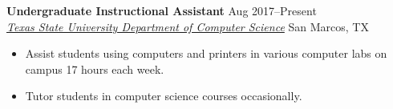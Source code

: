 \documentclass[10pt]{article}
\newcommand{\ressubheading}[4]{
    \textbf{#1} \hfill #2 \\[0pt]
    \textit{#3} \hfill #4 \\[0pt]
}
\newenvironment{resitemize}{
    \vspace{-6pt}
    \begin{itemize}
    \setlength\itemsep{-2pt}
}{
    \end{itemize}
}
\begin{document}
\begin{NoHyper}
\ressubheading
	{Undergraduate Instructional Assistant}
	{Aug 2017--Present}
	{\href{https://cs.txstate.edu/accounts/lab_assistants/}{Texas State University Department of Computer Science}}
	{San Marcos, TX}
    \begin{resitemize}
        \item Assist students using computers and printers in various computer labs on campus 17 hours each week.
        \item Tutor students in computer science courses occasionally.
    \end{resitemize}

    

\end{NoHyper}
\end{document}
